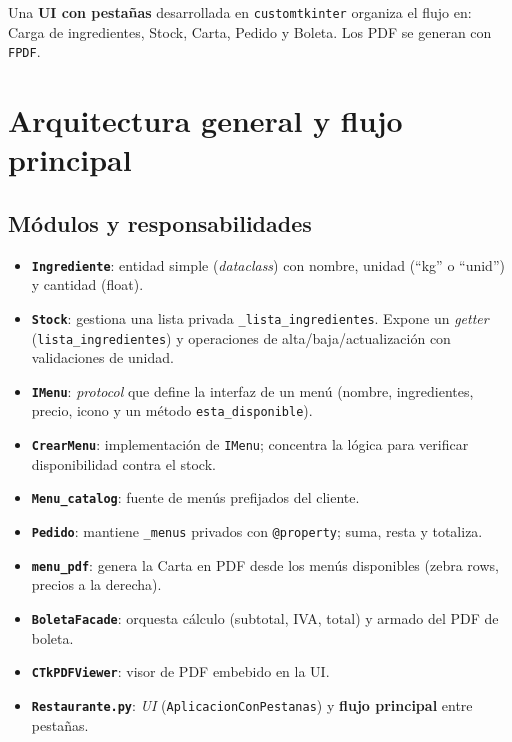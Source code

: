 \documentclass[12pt,a4paper]{article}
\newcommand{\codehl}[1]{\colorbox{yellow!30}{\texttt{#1}}}
\begin{document}
Una \textbf{UI con pestañas} desarrollada en \texttt{customtkinter} organiza el flujo en: Carga de ingredientes, Stock, Carta, Pedido y Boleta. Los PDF se generan con \texttt{FPDF}.

\newpage

\section{Arquitectura general y flujo principal}
\subsection*{Módulos y responsabilidades}
\begin{itemize}[leftmargin=*]
  \item \textbf{\texttt{Ingrediente}}: entidad simple (\textit{dataclass}) con nombre, unidad (``kg'' o ``unid'') y cantidad (float).
  \item \textbf{\texttt{Stock}}: gestiona una lista privada \codehl{\_lista\_ingredientes}. Expone un \textit{getter} (\texttt{lista\_ingredientes}) y operaciones de alta/baja/actualización con validaciones de unidad.
  \item \textbf{\texttt{IMenu}}: \textit{protocol} que define la interfaz de un menú (nombre, ingredientes, precio, icono y un método \texttt{esta\_disponible}).
  \item \textbf{\texttt{CrearMenu}}: implementación de \texttt{IMenu}; concentra la lógica para verificar disponibilidad contra el stock.
  \item \textbf{\texttt{Menu\_catalog}}: fuente de menús prefijados del cliente.
  \item \textbf{\texttt{Pedido}}: mantiene \codehl{\_menus} privados con \texttt{@property}; suma, resta y totaliza.
  \item \textbf{\texttt{menu\_pdf}}: genera la Carta en PDF desde los menús disponibles (zebra rows, precios a la derecha).
  \item \textbf{\texttt{BoletaFacade}}: orquesta cálculo (subtotal, IVA, total) y armado del PDF de boleta.
  \item \textbf{\texttt{CTkPDFViewer}}: visor de PDF embebido en la UI.
  \item \textbf{\texttt{Restaurante.py}}: \textit{UI} (\texttt{AplicacionConPestanas}) y \textbf{flujo principal} entre pestañas.
\end{itemize}
\end{document}
